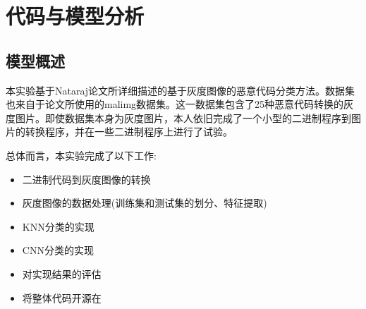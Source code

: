 \chapter{代码与模型分析}

\section{模型概述}

本实验基于Nataraj论文所详细描述的基于灰度图像的恶意代码分类方法。数据集也来自于论文所使用的malimg数据集。\cite{natarajMalwareImagesVisualization2011}这一数据集包含了25种恶意代码转换的灰度图片。即使数据集本身为灰度图片，本人依旧完成了一个小型的二进制程序到图片的转换程序，并在一些二进制程序上进行了试验。
\\ \hspace*{\fill} 

总体而言，本实验完成了以下工作:
\begin{itemize}
    \item 二进制代码到灰度图像的转换
    \item 灰度图像的数据处理(训练集和测试集的划分、特征提取)
    \item KNN分类的实现
    \item CNN分类的实现
    \item 对实现结果的评估
    \item 将整体代码开源在
\end{itemize}

